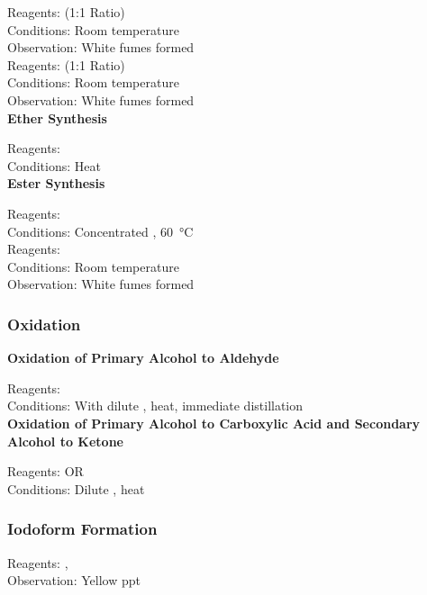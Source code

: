 \documentclass[../main]{subfiles}
\begin{document}
	Reagents:  (1:1 Ratio) \\
	Conditions:  Room temperature \\
	Observation: White fumes formed  \\

	Reagents:  (1:1 Ratio) \\
	Conditions:  Room temperature \\
	Observation: White fumes formed  \\

	\noindent \textbf{Ether Synthesis}

	Reagents:  \\
	Conditions:  Heat \\

	\noindent \textbf{Ester Synthesis}

	Reagents:  \\
	Conditions:  Concentrated , \SI{60}{\celsius} \\

	Reagents:  \\
	Conditions:  Room temperature \\
	Observation: White fumes formed  \\

	\subsubsection{Oxidation}

	\noindent \textbf{Oxidation of Primary Alcohol to Aldehyde}

	Reagents:  \\
	Conditions: With dilute , heat, immediate distillation \\

	\noindent \textbf{Oxidation of Primary Alcohol to Carboxylic Acid and Secondary Alcohol to Ketone}

	Reagents:  OR  \\
	Conditions: Dilute , heat \\

	\subsubsection{Iodoform Formation}

	Reagents: ,  \\
	Observation: Yellow ppt  \\
\end{document}
